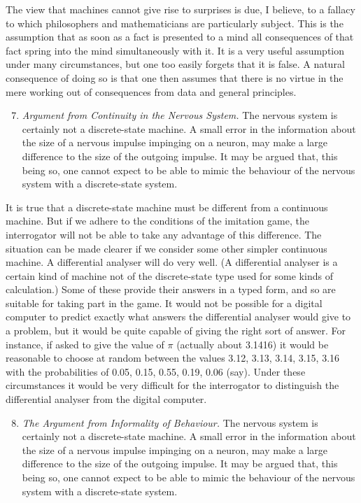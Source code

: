 \documentclass[12pt]{article}
\begin{document}
    The view that machines cannot give rise to surprises is due, I believe, to a fallacy to which philosophers and mathematicians are particularly subject. This is the assumption that as soon as a fact is presented to a mind all consequences of that fact spring into the mind simultaneously with it. It is a very useful assumption under many circumstances, but one too easily forgets that it is false. A natural consequence of doing so is that one then assumes that there is no virtue in the mere working out of consequences from data and general principles.

    \begin{enumerate}[label=(\arabic*)]
        \setcounter{enumi}{6}
        \item{\textit{Argument from Continuity in the Nervous System.} The nervous system is certainly not a discrete-state machine. A small error in the information about the size of a nervous impulse impinging on a neuron, may make a large difference to the size of the outgoing impulse. It may be argued that, this being so, one cannot expect to be able to mimic the behaviour of the nervous system with a discrete-state system.}
    \end{enumerate}

    It is true that a discrete-state machine must be different from a continuous machine. But if we adhere to the conditions of the imitation game, the interrogator will not be able to take any advantage of this difference. The situation can be made clearer if we consider some other simpler continuous machine. A differential analyser will do very well. (A differential analyser is a certain kind of machine not of the discrete-state type used for some kinds of calculation.) Some of these provide their answers in a typed form, and so are suitable for taking part in the game. It would not be possible for a digital computer to predict exactly what answers the differential analyser would give to a problem, but it would be quite capable of giving the right sort of answer. For instance, if asked to give the value of $\pi$ (actually about 3.1416) it would be reasonable to choose at random between the values 3.12, 3.13, 3.14, 3.15, 3.16 with the probabilities of 0.05, 0.15, 0.55, 0.19, 0.06 (say). Under these circumstances it would be very difficult for the interrogator to distinguish the differential analyser from the digital computer.

    \begin{enumerate}[label=(\arabic*)]
        \setcounter{enumi}{7}
        \item{\textit{The Argument from Informality of Behaviour.} The nervous system is certainly not a discrete-state machine. A small error in the information about the size of a nervous impulse impinging on a neuron, may make a large difference to the size of the outgoing impulse. It may be argued that, this being so, one cannot expect to be able to mimic the behaviour of the nervous system with a discrete-state system.}
    \end{enumerate}
\end{document}

